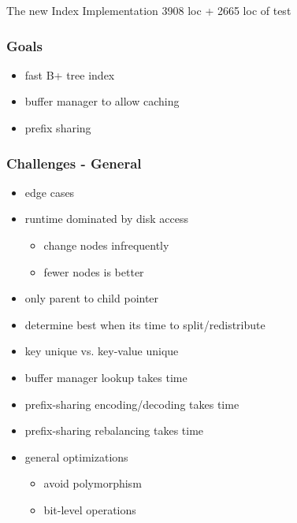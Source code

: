 \documentclass{beamer}
\begin{document}
  \begin{section}{The new Index Implementation}
    3908 loc + 2665 loc of test
    \begin{frame}
      \frametitle{Goals}
        \begin{itemize}
          \item fast B+ tree index
          \item buffer manager to allow caching
          \item prefix sharing
        \end{itemize}
    \end{frame}
    \begin{frame}
      \frametitle{Challenges - General}
        \begin{itemize}
          \item edge cases
          \item runtime dominated by disk access
          \begin{itemize}
            \item change nodes infrequently
            \item fewer nodes is better
          \end{itemize}
          \item only parent to child pointer
          \item determine best when its time to split/redistribute
          \item key unique vs. key-value unique
          \item buffer manager lookup takes time 
          \item prefix-sharing encoding/decoding takes time
          \item prefix-sharing rebalancing takes time
          \item general optimizations
            \begin{itemize}
              \item avoid polymorphism
              \item bit-level operations
            \end{itemize}
        \end{itemize}
    \end{frame}
    

\end{section}
\end{document}
